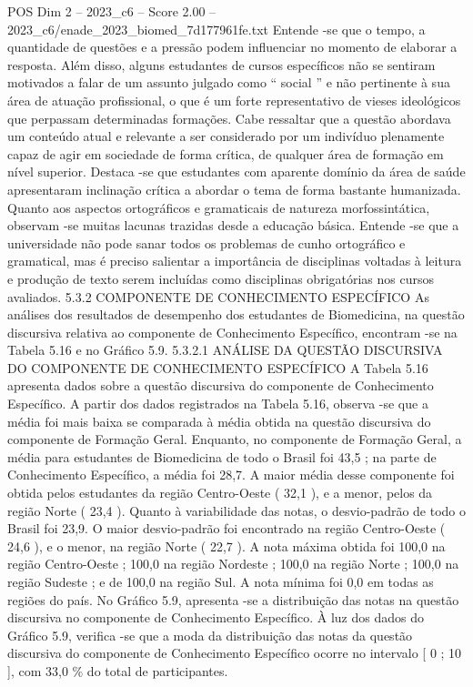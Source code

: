 \begin{textsample}{POS Dim 2 – 2023\_c6 – Score 2.00 – 2023\_c6/enade\_2023\_biomed\_7d177961fe.txt}
Entende -se que o tempo, a quantidade de questões e a pressão podem influenciar no momento de elaborar a resposta.
Além disso, alguns estudantes de cursos específicos não se sentiram motivados a falar de um assunto julgado como “ social ” e não pertinente à sua área de atuação profissional, o que é um forte representativo de vieses ideológicos que perpassam determinadas formações.
Cabe ressaltar que a questão abordava um conteúdo atual e relevante a ser considerado por um indivíduo plenamente capaz de agir em sociedade de forma crítica, de qualquer área de formação em nível superior.
Destaca -se que estudantes com aparente domínio da área de saúde apresentaram inclinação crítica a abordar o tema de forma bastante humanizada.
Quanto aos aspectos ortográficos e gramaticais de natureza morfossintática, observam -se muitas lacunas trazidas desde a educação básica.
Entende -se que a universidade não pode sanar todos os problemas de cunho ortográfico e gramatical, mas é preciso salientar a importância de disciplinas voltadas à leitura e produção de texto serem incluídas como disciplinas obrigatórias nos cursos avaliados. 5.3.2 COMPONENTE DE CONHECIMENTO ESPECÍFICO As análises dos resultados de desempenho dos estudantes de Biomedicina, na questão discursiva relativa ao componente de Conhecimento Específico, encontram -se na Tabela 5.16 e no Gráfico 5.9. 5.3.2.1 ANÁLISE DA QUESTÃO DISCURSIVA DO COMPONENTE DE CONHECIMENTO ESPECÍFICO A Tabela 5.16 apresenta dados sobre a questão discursiva do componente de Conhecimento Específico.
A partir dos dados registrados na Tabela 5.16, observa -se que a média foi mais baixa se comparada à média obtida na questão discursiva do componente de Formação Geral.
Enquanto, no componente de Formação Geral, a média para estudantes de Biomedicina de todo o Brasil foi 43,5 ; na parte de Conhecimento Específico, a média foi 28,7.
A maior média desse componente foi obtida pelos estudantes da região Centro-Oeste ( 32,1 ), e a menor, pelos da região Norte ( 23,4 ).
Quanto à variabilidade das notas, o desvio-padrão de todo o Brasil foi 23,9.
O maior desvio-padrão foi encontrado na região Centro-Oeste ( 24,6 ), e o menor, na região Norte ( 22,7 ).
A nota máxima obtida foi 100,0 na região Centro-Oeste ; 100,0 na região Nordeste ; 100,0 na região Norte ; 100,0 na região Sudeste ; e de 100,0 na região Sul.
A nota mínima foi 0,0 em todas as regiões do país.
No Gráfico 5.9, apresenta -se a distribuição das notas na questão discursiva no componente de Conhecimento Específico.
À luz dos dados do Gráfico 5.9, verifica -se que a moda da distribuição das notas da questão discursiva do componente de Conhecimento Específico ocorre no intervalo [ 0 ; 10 ], com 33,0 \% do total de participantes.

\end{textsample}
